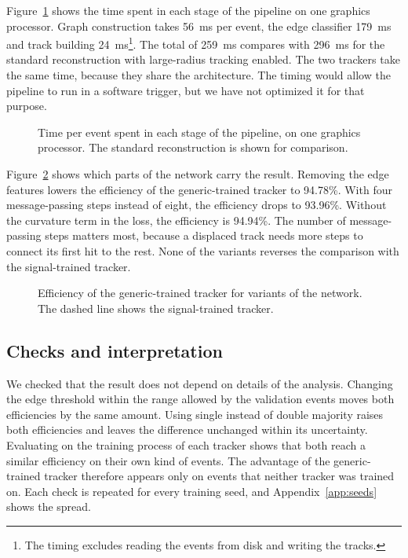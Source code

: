 Figure~\ref{fig:timing} shows the time spent in each stage of the pipeline on one graphics
processor. Graph construction takes 56~ms per event, the edge classifier 179~ms and track building
24~ms\footnote{The timing excludes reading the events from disk and writing the tracks.}. The total
of 259~ms compares with 296~ms for the standard reconstruction with large-radius tracking enabled.
The two trackers take the same time, because they share the architecture. The timing would allow the
pipeline to run in a software trigger, but we have not optimized it for that purpose.

\begin{figure}[tbp]
  \centering
  \caption{Time per event spent in each stage of the pipeline, on one graphics processor. The standard reconstruction is shown for comparison.}
  \label{fig:timing}
\end{figure}

Figure~\ref{fig:ablation} shows which parts of the network carry the result. Removing the edge
features lowers the efficiency of the generic-trained tracker to 94.78\%. With four message-passing
steps instead of eight, the efficiency drops to 93.96\%. Without the curvature term in the loss, the
efficiency is 94.94\%. The number of message-passing steps matters most, because a displaced track
needs more steps to connect its first hit to the rest. None of the variants reverses the comparison
with the signal-trained tracker.

\begin{figure}[tbp]
  \centering
  \caption{Efficiency of the generic-trained tracker for variants of the network. The dashed line shows the signal-trained tracker.}
  \label{fig:ablation}
\end{figure}

\subsection{Checks and interpretation}
\label{sec:checks}

We checked that the result does not depend on details of the analysis. Changing the edge threshold
within the range allowed by the validation events moves both efficiencies by the same amount. Using
single instead of double majority raises both efficiencies and leaves the difference unchanged
within its uncertainty. Evaluating on the training process of each tracker shows that both reach a
similar efficiency on their own kind of events. The advantage of the generic-trained tracker
therefore appears only on events that neither tracker was trained on. Each check is repeated for
every training seed, and Appendix~\ref{app:seeds} shows the spread.

